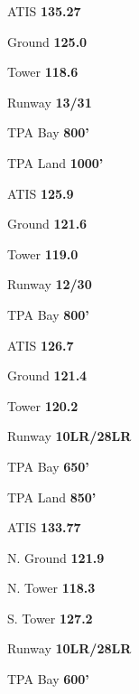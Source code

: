 \colorbox{orange!80}{}

\colorbox{orange!60}{}

ATIS \dotfill \textbf{135.27}

Ground \dotfill \textbf{125.0}

Tower \dotfill \textbf{118.6}

Runway \dotfill \textbf{13/31}

TPA Bay \dotfill \textbf{800'}

TPA Land \dotfill \textbf{1000'}

\colorbox{orange!60}{}

ATIS \dotfill \textbf{125.9}

Ground \dotfill \textbf{121.6}

Tower \dotfill \textbf{119.0}

Runway \dotfill \textbf{12/30}

TPA Bay \dotfill \textbf{800'}

\colorbox{orange!60}{}

ATIS \dotfill \textbf{126.7}

Ground \dotfill \textbf{121.4}

Tower \dotfill \textbf{120.2}

Runway \dotfill \textbf{10LR/28LR}

TPA Bay \dotfill \textbf{650'}

TPA Land \dotfill \textbf{850'}

\colorbox{orange!60}{}

ATIS \dotfill \textbf{133.77}

N. Ground \dotfill \textbf{121.9}

N. Tower \dotfill \textbf{118.3}

S. Tower \dotfill \textbf{127.2}

Runway \dotfill \textbf{10LR/28LR}

TPA Bay \dotfill \textbf{600'} \\